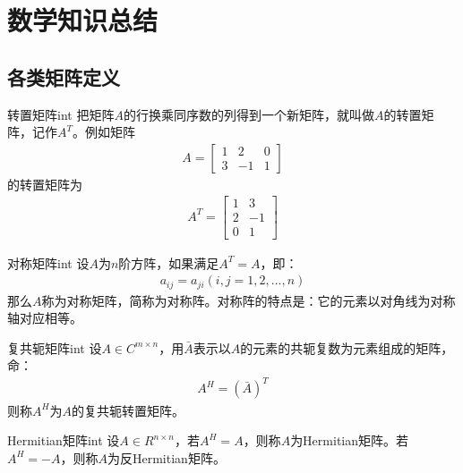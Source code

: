 \chapter{数学知识总结}

\section{各类矩阵定义}
\begin{definition}{\hypertarget{transpose}{转置矩阵}}{int}
\label{def:transpose}
把矩阵$A$的行换乘同序数的列得到一个新矩阵，就叫做$A$的转置矩阵，记作$A^{T}$。例如矩阵
\begin{align}
A = 
\begin{bmatrix}
1 & 2 & 0 \\
3 & -1 & 1
\end{bmatrix}
\end{align}
的转置矩阵为
\begin{align}
A^{T} = 
\begin{bmatrix}
1 & 3 \\
2 & -1 \\
0 & 1
\end{bmatrix}
\end{align}
\end{definition}

\begin{definition}{\hypertarget{symmetric}{对称矩阵}}{int}
\label{def:symmetric}
设$A$为$n$阶方阵，如果满足$A^T=A$，即：
\begin{align}
a_{ij} = a_{ji}  (i,j=1, 2, ..., n)
\end{align}
那么$A$称为对称矩阵，简称为对称阵。对称阵的特点是：它的元素以对角线为对称轴对应相等。
\end{definition}

\begin{definition}{\hypertarget{ctranspose}{复共轭矩阵}}{int}
\label{def:ctranspose}
设$A\in{C^{m\times{n}}}$，用$\bar{A}$表示以$A$的元素的共轭复数为元素组成的矩阵，命：
\begin{align}
A^{H} = (\bar{A})^{T}
\end{align}
则称$A^{H}$为$A$的复共轭转置矩阵。
\end{definition}

\begin{definition}{\hypertarget{hermitian}{Hermitian矩阵}}{int}
\label{def:hermitian}
设$A\in{R^{n\times{n}}}$，若$A^{H}=A$，则称$A$为Hermitian矩阵。若$A^{H}=-A$，则称$A$为反Hermitian矩阵。
\end{definition}

